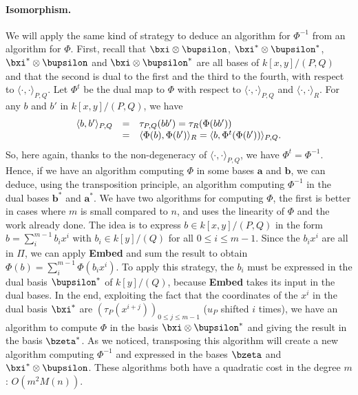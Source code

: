 \documentclass[a4paper,11pt]{article}
\theoremstyle{break}
\theoremstyle{definition}
\theoremstyle{remark}
\newcommand{\ps}[2]{\langle#1,#2\rangle}
\newcommand{\psdot}{\ps{\cdot}{\cdot}}
\begin{document}
\paragraph{Isomorphism.} We will apply the same kind of strategy to deduce an 
algorithm for $\Phi^{-1}$ from an algorithm for $\Phi$. First, recall that 
$\bxi\otimes\bupsilon$, $\bxi^*\otimes\bupsilon^*$, $\bxi^*\otimes\bupsilon$ 
and $\bxi\otimes\bupsilon^*$ are all bases of $k[x,y]/(P,Q)$ and that the 
second is dual to the first and the third to the fourth, with respect to 
$\psdot_{P,Q}$. Let $\Phi^t$ be the dual map to $\Phi$ with respect to 
$\psdot_{P,Q}$ and $\psdot_R$. For any $b$ and $b'$ in $k[x,y]/(P,Q)$, we have
\[
\begin{array}[here]{rcl}
  \ps{b}{b'}_{P,Q} &=& \tau_{P,Q}(bb') = \tau_R(\Phi(bb')) \\
  &=& \ps{\Phi(b)}{\Phi(b')}_R = \ps{b}{\Phi^t(\Phi(b'))}_{P,Q}.
\end{array}
\]
So, here again, thanks to the non-degeneracy of $\psdot_{P,Q}$, we have 
$\Phi^t=\Phi^{-1}$. Hence, if we have an algorithm computing $\Phi$ in  
some bases $\textbf{a}$ and $\textbf{b}$, we can deduce, using the 
transposition principle, an algorithm computing $\Phi^{-1}$ in the dual bases 
$\textbf{b}^*$ and $\textbf{a}^*$. We have two algorithms for computing $\Phi$, 
the first is better in cases where $m$ is small compared to $n$, and uses the 
linearity of $\Phi$ and the work already done. The idea is to express $b\in 
k[x,y]/(P,Q)$ in the form $b=\sum_i^{m-1}b_ix^i$ with $b_i\in k[y]/(Q)$ for all 
$0\leq i \leq m-1$. Since the $b_ix^i$ are all in $\Pi$, we can apply 
\textbf{Embed} and sum the result to obtain $\Phi(b)=\sum_i^{m-1}\Phi(b_ix^i)$. 
To apply this strategy, the $b_i$ must be expressed in the dual basis 
$\bupsilon^*$ of $k[y]/(Q)$, because \textbf{Embed} takes its input in the dual 
bases. In the end, exploiting the fact that the coordinates of the $x^i$ in the 
dual basis $\bxi^*$ are $(\tau_P(x^{i+j}))_{0\leq j\leq m-1}$ ($u_P$ shifted 
$i$ times), we have an algorithm to compute $\Phi$ in the basis 
$\bxi\otimes\bupsilon^*$ and giving the result in the basis $\bzeta^*$. As we 
noticed, transposing this algorithm will create a new algorithm computing 
$\Phi^{-1}$ and expressed in the bases $\bzeta$ and $\bxi^*\otimes\bupsilon$. 
These algorithms both have a quadratic cost in the degree $m$: $O(m^2M(n))$.
\end{document}
